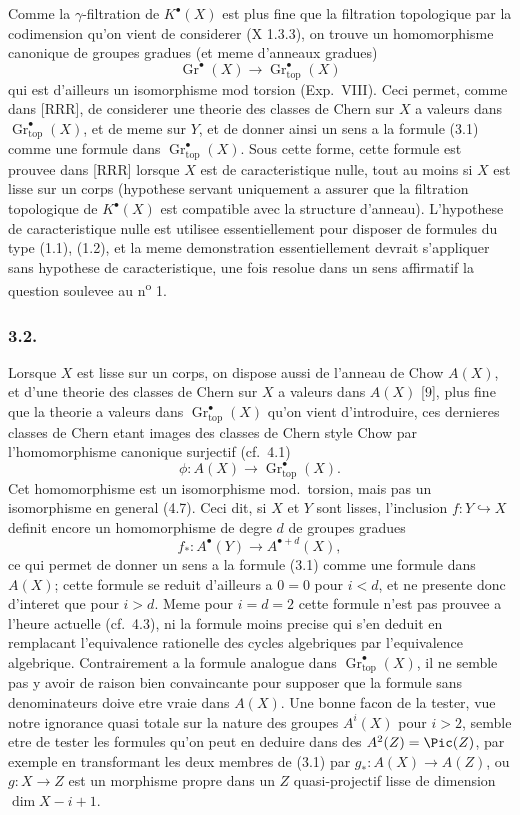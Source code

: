 Comme la $\gamma$-filtration de $K^{\bullet}(X)$ est plus fine que la filtration topologique par la codimension qu'on vient de considerer (X 1.3.3), on trouve un homomorphisme canonique de groupes gradues (et meme d'anneaux gradues)
\[
\operatorname{Gr}^{\bullet}(X) \longrightarrow \operatorname{Gr}_{\mathrm{top}}^{\bullet}(X)
\]
qui est d'ailleurs un isomorphisme mod torsion (Exp.\ VIII). Ceci permet, comme dans [RRR], de considerer une theorie des classes de Chern sur $X$ a valeurs dans $\operatorname{Gr}_{\mathrm{top}}^{\bullet}(X)$, et de meme sur $Y$, et de donner ainsi un sens a la formule (3.1) comme une formule dans $\operatorname{Gr}_{\mathrm{top}}^{\bullet}(X)$. Sous cette forme, cette formule est prouvee dans [RRR] lorsque $X$ est de caracteristique nulle, tout au moins si $X$ est lisse sur un corps (hypothese servant uniquement a assurer que la filtration topologique de $K^{\bullet}(X)$ est compatible avec la structure d'anneau). L'hypothese de caracteristique nulle est utilisee essentiellement pour disposer de formules du type (1.1), (1.2), et la meme demonstration essentiellement devrait s'appliquer sans hypothese de caracteristique, une fois resolue dans un sens affirmatif la question soulevee au n\textsuperscript{o} 1.

\subsubsection*{3.2.}
Lorsque $X$ est lisse sur un corps, on dispose aussi de l'anneau de Chow $A(X)$, et d'une theorie des classes de Chern sur $X$ a valeurs dans $A(X)$ [9], plus fine que la theorie a valeurs dans $\operatorname{Gr}_{\mathrm{top}}^{\bullet}(X)$ qu'on vient d'introduire, ces dernieres classes de Chern etant images des classes de Chern style Chow par l'homomorphisme canonique surjectif (cf.\ 4.1)
\[
\phi : A(X) \longrightarrow \operatorname{Gr}_{\mathrm{top}}^{\bullet}(X).
\]
Cet homomorphisme est un isomorphisme mod.\ torsion, mais pas un isomorphisme en general (4.7). Ceci dit, si $X$ et $Y$ sont lisses, l'inclusion $f : Y \hookrightarrow X$ definit encore un homomorphisme de degre $d$ de groupes gradues
\[
f_{*} : A^{\bullet}(Y) \longrightarrow A^{\bullet+d}(X),
\]
ce qui permet de donner un sens a la formule (3.1) comme une formule dans $A(X)$; cette formule se reduit d'ailleurs a $0 = 0$ pour $i < d$, et ne presente donc d'interet que pour $i > d$. Meme pour $i = d = 2$ cette formule n'est pas prouvee a l'heure actuelle (cf.\ 4.3), ni la formule moins precise qui s'en deduit en remplacant l'equivalence rationelle des cycles algebriques par l'equivalence algebrique. Contrairement a la formule analogue dans $\operatorname{Gr}_{\mathrm{top}}^{\bullet}(X)$, il ne semble pas y avoir de raison bien convaincante pour supposer que la formule sans denominateurs doive etre vraie dans $A(X)$. Une bonne facon de la tester, vue notre ignorance quasi totale sur la nature des groupes $A^{i}(X)$ pour $i > 2$, semble etre de tester les formules qu'on peut en deduire dans des $A^{2}(Z) = \Pic(Z)$, par exemple en transformant les deux membres de (3.1) par $g_{*} : A(X) \to A(Z)$, ou $g : X \to Z$ est un morphisme propre dans un $Z$ quasi-projectif lisse de dimension $\dim X - i + 1$.

